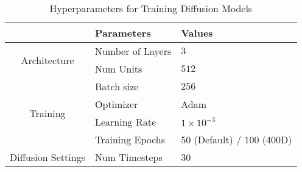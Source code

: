 

\begin{table*}[h]
\centering
\caption{Hyperparameters for Training Diffusion Models}
\begin{tabular}{c|ll}
\toprule
& Parameters & Values \\
\midrule
\multirow{2}{*}{Architecture} & Number of Layers & $3$ \\
                              & Num Units & $512$\\
\midrule
\multirow{4}{*}{Training} & Batch size & $256$ \\
                          & Optimizer & Adam \\
                          & Learning Rate & $1 \times 10^{-3}$ \\
                          & Training Epochs & $50$ (Default) / $100$ (400D) \\
\midrule
\multirow{1}{*}{Diffusion Settings} & Num Timesteps & 30 \\ 
\bottomrule
\end{tabular}
\label{table:prior hyperparams}
\end{table*}